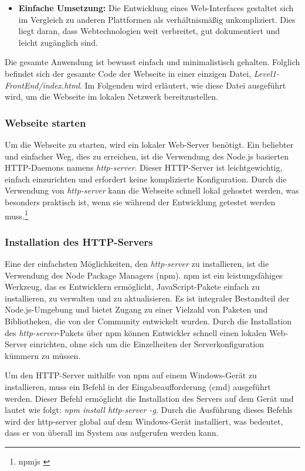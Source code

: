 \begin{itemize}
\begin{itemize}
    \item \textbf{Einfache Umsetzung:} Die Entwicklung eines Web-Interfaces gestaltet sich im Vergleich zu anderen Plattformen als verhältnismäßig unkompliziert. Dies liegt daran, dass Webtechnologien weit verbreitet, gut dokumentiert und leicht zugänglich sind.
\end{itemize}

Die gesamte Anwendung ist bewusst einfach und minimalistisch gehalten. Folglich befindet sich der gesamte Code der Webseite in einer einzigen Datei, \textit{Level1-FrontEnd/index.html}. Im Folgenden wird erläutert, wie diese Datei ausgeführt wird, um die Webseite im lokalen Netzwerk bereitzustellen.

\subsubsection{Webseite starten}

Um die Webseite zu starten, wird ein lokaler Web-Server benötigt. Ein beliebter und einfacher Weg, dies zu erreichen, ist die Verwendung des Node.js basierten HTTP-Daemons namens \textit{http-server}. Dieser HTTP-Server ist leichtgewichtig, einfach einzurichten und erfordert keine komplizierte Konfiguration. Durch die Verwendung von \textit{http-server} kann die Webseite schnell lokal gehostet werden, was besonders praktisch ist, wenn sie während der Entwicklung getestet
werden muss.\footnote{npmjs \cite{http-server}}

\subsubsection*{Installation des HTTP-Servers}
Eine der einfachsten Möglichkeiten, den \textit{http-server} zu installieren, ist die Verwendung des Node Package Managers (npm). npm ist ein leistungsfähiges Werkzeug, das es Entwicklern ermöglicht, JavaScript-Pakete einfach zu installieren, zu verwalten und zu aktualisieren. Es ist integraler Bestandteil der Node.js-Umgebung und bietet Zugang zu einer Vielzahl von Paketen und Bibliotheken, die von der Community entwickelt wurden. Durch die Installation des \textit{http-server}-Pakets über npm können Entwickler schnell einen lokalen Web-Server einrichten, ohne sich um die Einzelheiten der Serverkonfiguration kümmern zu müssen.

Um den HTTP-Server mithilfe von npm auf einem Windows-Gerät zu installieren, muss ein Befehl in der Eingabeaufforderung (cmd) ausgeführt werden. Dieser Befehl ermöglicht die Installation des Servers auf dem Gerät und lautet wie folgt: \textit{npm install http-server -g}. Durch die Ausführung dieses Befehls wird der http-server global auf dem Windows-Gerät installiert, was bedeutet, dass er von überall im System aus aufgerufen werden kann.


\end{itemize}
